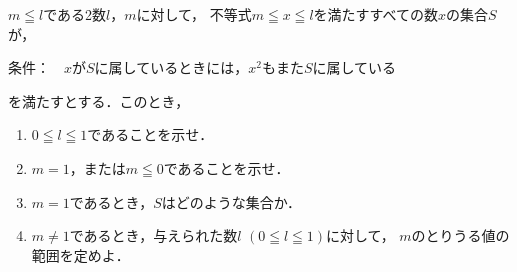 \documentclass[../../main.tex]{subfiles}
\begin{document}
$m \leqq l$である2数$l$，$m$に対して，
不等式$m \leqq x \leqq l$を満たすすべての数$x$の集合$S$が，
\begin{center}
  条件：　$x$が$S$に属しているときには，$x^2$もまた$S$に属している
\end{center}
を満たすとする．このとき，
\begin{enumerate}
  \item $0 \leqq l \leqq 1$であることを示せ．
  \item $m=1$，または$m \leqq 0$であることを示せ．
  \item $m=1$であるとき，$S$はどのような集合か．
  \item $m \neq 1$であるとき，与えられた数$l$ $(0 \leqq l \leqq 1)$に対して，
    $m$のとりうる値の範囲を定めよ．
\end{enumerate}
\end{document}
